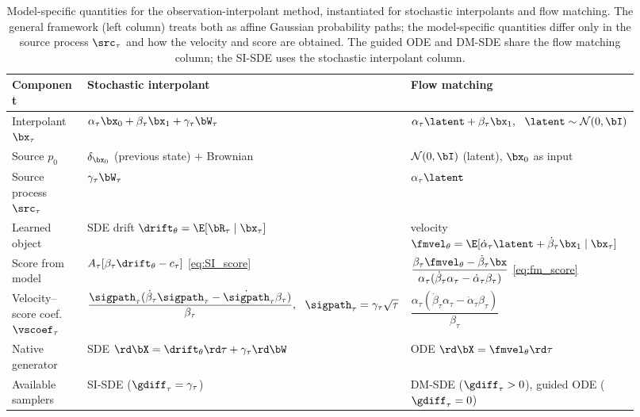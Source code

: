 \begin{table}[ht]
    \centering
    \caption{Model-specific quantities for the observation-interpolant method, instantiated for stochastic interpolants and flow matching. The general framework (left column) treats both as affine Gaussian probability paths; the model-specific quantities differ only in the source process $\src_\tau$ and how the velocity and score are obtained. The guided ODE and DM-SDE share the flow matching column; the SI-SDE uses the stochastic interpolant column.}
    \label{tab:si_vs_fm}
    \small
    \begin{tabular}{p{0.235\linewidth}|p{0.345\linewidth}|p{0.345\linewidth}}
        \toprule
        \textbf{Component} & \textbf{Stochastic interpolant} & \textbf{Flow matching} \\
        \midrule
        Interpolant $\bx_\tau$
            & $\alpha_\tau\bx_0 + \beta_\tau\bx_1 + \gamma_\tau\bW_\tau$
            & $\alpha_\tau\latent + \beta_\tau\bx_1,\ \ \latent\sim\mathcal{N}(0,\bI)$ \\
        Source $p_0$
            & $\delta_{\bx_0}$ (previous state) $+$ Brownian
            & $\mathcal{N}(0,\bI)$ (latent), $\bx_0$ as input \\
        Source process $\src_\tau$
            & $\gamma_\tau\bW_\tau$
            & $\alpha_\tau\latent$ \\
        Learned object
            & SDE drift $\drift_\theta=\E[\bR_\tau\mid\bx_\tau]$
            & velocity $\fmvel_\theta=\E[\dot\alpha_\tau\latent+\dot\beta_\tau\bx_1\mid\bx_\tau]$ \\
        Score from model
            & $A_\tau[\beta_\tau\drift_\theta - c_\tau]$ \eqref{eq:SI_score}
            & $\dfrac{\beta_\tau\fmvel_\theta-\dot\beta_\tau\bx}{\alpha_\tau(\dot\beta_\tau\alpha_\tau-\dot\alpha_\tau\beta_\tau)}$ \eqref{eq:fm_score} \\
        Velocity--score coef.\ $\vscoef_\tau$
            & $\dfrac{\sigpath_\tau(\dot\beta_\tau\sigpath_\tau-\dot\sigpath_\tau\beta_\tau)}{\beta_\tau},\ \ \sigpath_\tau=\gamma_\tau\sqrt\tau$
            & $\dfrac{\alpha_\tau(\dot\beta_\tau\alpha_\tau-\dot\alpha_\tau\beta_\tau)}{\beta_\tau}$ \\
        Native generator
            & SDE $\rd\bX=\drift_\theta\rd\tau+\gamma_\tau\rd\bW$
            & ODE $\rd\bX=\fmvel_\theta\rd\tau$ \\
        Available samplers
            & SI-SDE ($\gdiff_\tau=\gamma_\tau$)
            & DM-SDE ($\gdiff_\tau>0$), guided ODE ($\gdiff_\tau=0$) \\

\end{tabular}
\end{table}
